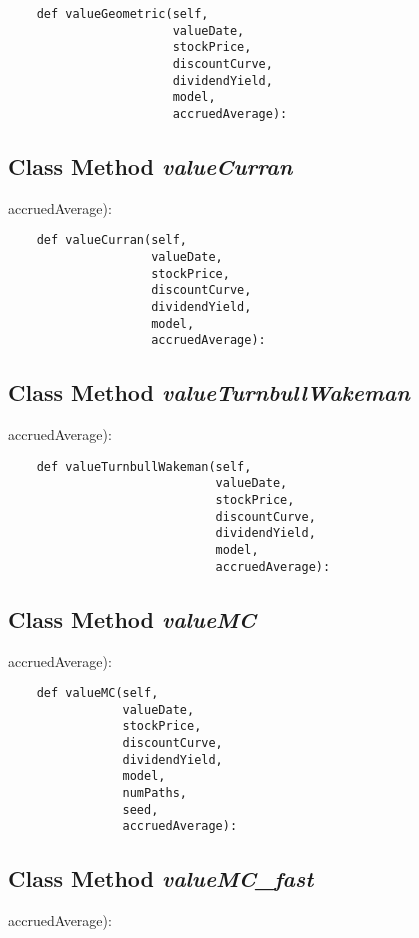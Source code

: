 \documentclass[twoside,11pt]{book}
\begin{document}
\begin{lstlisting}
    def valueGeometric(self,
                       valueDate,
                       stockPrice,
                       discountCurve,
                       dividendYield,
                       model,
                       accruedAverage):
\end{lstlisting}

\subsection{Class Method {\it valueCurran}}
accruedAverage):

\begin{lstlisting}
    def valueCurran(self,
                    valueDate,
                    stockPrice,
                    discountCurve,
                    dividendYield,
                    model,
                    accruedAverage):
\end{lstlisting}

\subsection{Class Method {\it valueTurnbullWakeman}}
accruedAverage):

\begin{lstlisting}
    def valueTurnbullWakeman(self,
                             valueDate,
                             stockPrice,
                             discountCurve,
                             dividendYield,
                             model,
                             accruedAverage):
\end{lstlisting}

\subsection{Class Method {\it valueMC}}
accruedAverage):

\begin{lstlisting}
    def valueMC(self,
                valueDate,
                stockPrice,
                discountCurve,
                dividendYield,
                model,
                numPaths,
                seed,
                accruedAverage):
\end{lstlisting}

\subsection{Class Method {\it valueMC\_fast}}
accruedAverage):
\end{document}
